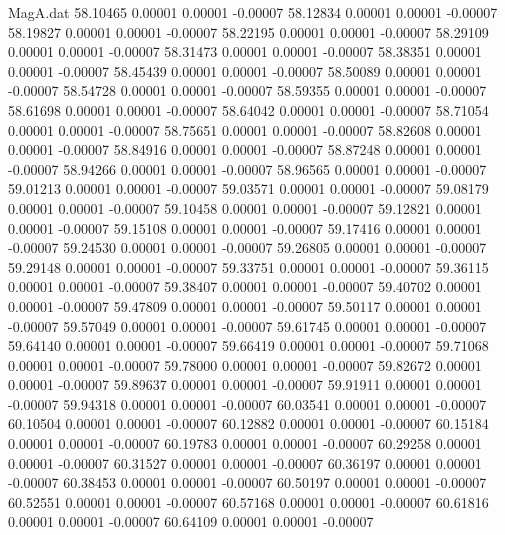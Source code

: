 \begin{filecontents}{MagA.dat}
  58.10465    0.00001    0.00001   -0.00007
  58.12834    0.00001    0.00001   -0.00007
  58.19827    0.00001    0.00001   -0.00007
  58.22195    0.00001    0.00001   -0.00007
  58.29109    0.00001    0.00001   -0.00007
  58.31473    0.00001    0.00001   -0.00007
  58.38351    0.00001    0.00001   -0.00007
  58.45439    0.00001    0.00001   -0.00007
  58.50089    0.00001    0.00001   -0.00007
  58.54728    0.00001    0.00001   -0.00007
  58.59355    0.00001    0.00001   -0.00007
  58.61698    0.00001    0.00001   -0.00007
  58.64042    0.00001    0.00001   -0.00007
  58.71054    0.00001    0.00001   -0.00007
  58.75651    0.00001    0.00001   -0.00007
  58.82608    0.00001    0.00001   -0.00007
  58.84916    0.00001    0.00001   -0.00007
  58.87248    0.00001    0.00001   -0.00007
  58.94266    0.00001    0.00001   -0.00007
  58.96565    0.00001    0.00001   -0.00007
  59.01213    0.00001    0.00001   -0.00007
  59.03571    0.00001    0.00001   -0.00007
  59.08179    0.00001    0.00001   -0.00007
  59.10458    0.00001    0.00001   -0.00007
  59.12821    0.00001    0.00001   -0.00007
  59.15108    0.00001    0.00001   -0.00007
  59.17416    0.00001    0.00001   -0.00007
  59.24530    0.00001    0.00001   -0.00007
  59.26805    0.00001    0.00001   -0.00007
  59.29148    0.00001    0.00001   -0.00007
  59.33751    0.00001    0.00001   -0.00007
  59.36115    0.00001    0.00001   -0.00007
  59.38407    0.00001    0.00001   -0.00007
  59.40702    0.00001    0.00001   -0.00007
  59.47809    0.00001    0.00001   -0.00007
  59.50117    0.00001    0.00001   -0.00007
  59.57049    0.00001    0.00001   -0.00007
  59.61745    0.00001    0.00001   -0.00007
  59.64140    0.00001    0.00001   -0.00007
  59.66419    0.00001    0.00001   -0.00007
  59.71068    0.00001    0.00001   -0.00007
  59.78000    0.00001    0.00001   -0.00007
  59.82672    0.00001    0.00001   -0.00007
  59.89637    0.00001    0.00001   -0.00007
  59.91911    0.00001    0.00001   -0.00007
  59.94318    0.00001    0.00001   -0.00007
  60.03541    0.00001    0.00001   -0.00007
  60.10504    0.00001    0.00001   -0.00007
  60.12882    0.00001    0.00001   -0.00007
  60.15184    0.00001    0.00001   -0.00007
  60.19783    0.00001    0.00001   -0.00007
  60.29258    0.00001    0.00001   -0.00007
  60.31527    0.00001    0.00001   -0.00007
  60.36197    0.00001    0.00001   -0.00007
  60.38453    0.00001    0.00001   -0.00007
  60.50197    0.00001    0.00001   -0.00007
  60.52551    0.00001    0.00001   -0.00007
  60.57168    0.00001    0.00001   -0.00007
  60.61816    0.00001    0.00001   -0.00007
  60.64109    0.00001    0.00001   -0.00007

\end{filecontents}
